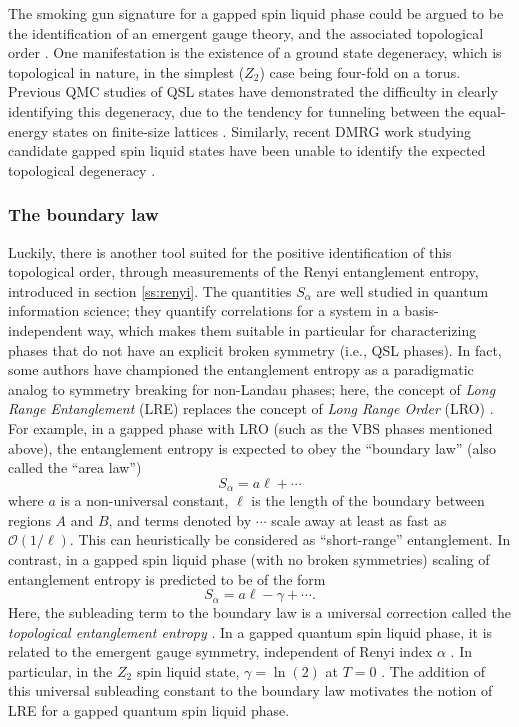 \documentclass[10pt,pre,aps,twocolumn,showpacs,subscriptaddresses,floatfix]{revtex4}
\begin{document}
The smoking gun signature for a gapped spin liquid phase could be argued to be the identification of an emergent gauge theory,
and the associated topological order \cite{Wenbook}.  One manifestation is the existence of a ground state degeneracy, which is topological in nature, in the simplest ($Z_2$) case being four-fold on a torus.  Previous QMC studies of QSL states have demonstrated the difficulty in clearly identifying this degeneracy, due to the tendency for tunneling between the equal-energy states on finite-size lattices \cite{Isakov1}.  Similarly, recent DMRG work studying candidate gapped spin liquid states have been unable to identify the expected topological degeneracy \cite{Yan,J1J2}.

\subsubsection{The boundary law}
Luckily, there is another tool suited for the positive identification of this topological order, through measurements of the Renyi entanglement entropy, introduced in section \ref{ss:renyi}.  The quantities $S_{\alpha}$ are well studied in quantum information science; they quantify correlations for a system in a basis-independent way, which makes them suitable in particular for characterizing phases that do not have an explicit broken symmetry (i.e., QSL phases).  In fact, some authors have championed the entanglement entropy as a paradigmatic analog to symmetry breaking for non-Landau phases; here, the concept of {\it Long Range Entanglement} (LRE) replaces the concept of {\it Long Range Order} (LRO) \cite{Wenbook}.  For example, in a gapped phase with LRO (such as the VBS phases mentioned above), the entanglement entropy is expected to obey the ``boundary law'' (also called the ``area law'')
\begin{equation} 
S_{\alpha} = a\ell + \cdots \label{arealaw}
\end{equation}
where $a$ is a non-universal constant, $\ell$ is the length of the boundary between regions $A$ and $B$, and terms denoted by $\cdots$ scale away at least as fast as $\mathcal{O} (1/\ell)$.  This can heuristically be considered as ``short-range'' entanglement.  In contrast, in a gapped spin liquid phase (with no broken symmetries)
scaling of entanglement entropy is predicted to be of the form
\begin{equation}
S_{\alpha} = a \ell - \gamma + \cdots \label{areaL}.
\end{equation}
 Here, the subleading term to the boundary law is a universal correction called the {\it topological entanglement entropy} \cite{Alioscia1,Alioscia2,LW,KP}.  In a gapped quantum spin liquid phase, it is related to the emergent gauge symmetry, independent of Renyi index $\alpha$ \cite{Flammia}.  In particular, in the $Z_2$ spin liquid state, $\gamma =  \ln(2)$ at $T=0$ \cite{LW}.   The addition of this universal subleading constant to the boundary law motivates the notion of LRE for a gapped quantum spin liquid phase.
\end{document}

